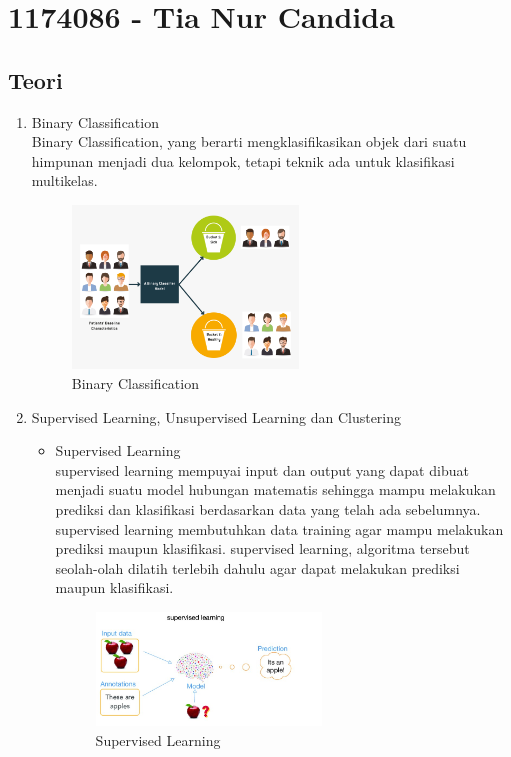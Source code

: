 \section{1174086 - Tia Nur Candida}

\subsection{Teori}
\begin{enumerate}
\item Binary Classification \\
Binary Classification, yang berarti mengklasifikasikan objek dari suatu himpunan menjadi dua kelompok, tetapi teknik ada untuk klasifikasi multikelas.

\hfill\break
\begin{figure}[H]
    \includegraphics[width=6cm]{figures/1174086/2/binary.png}
    \centering
    \caption{Binary Classification}
\end{figure}

\item Supervised Learning, Unsupervised Learning dan Clustering \\
\begin{itemize}
\item Supervised Learning \\
supervised learning mempuyai input dan output yang dapat dibuat menjadi suatu model hubungan matematis sehingga mampu melakukan prediksi dan klasifikasi berdasarkan data yang telah ada sebelumnya. supervised learning membutuhkan data training agar mampu melakukan prediksi maupun klasifikasi. supervised learning, algoritma tersebut seolah-olah dilatih terlebih dahulu agar dapat melakukan prediksi maupun klasifikasi.
\begin{figure}[H]
    \includegraphics[width=6cm]{figures/1174086/2/super.jpg}
    \centering
    \caption{Supervised Learning}
\end{figure}


\end{itemize}
\end{enumerate}
